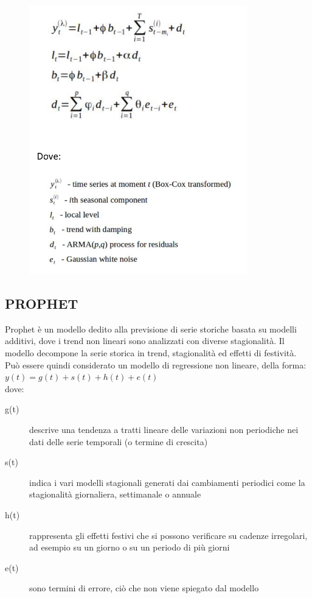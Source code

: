\documentclass[12pt, a4paper, twocolumn]{article} %
\begin{document}
\begin{figure}
  \caption{\protect\cite{tbats}}
  \begin{center}
    \includegraphics{tbats2.png}
  \end{center}
\end{figure}

\subsection{PROPHET}
Prophet è un modello dedito alla previsione di serie storiche basata su modelli additivi, dove i trend non lineari sono analizzati con diverse stagionalità. Il modello decompone la serie storica in trend, stagionalità ed effetti di festività.\\
Può essere quindi considerato un modello di regressione non lineare, della forma:\\
$y(t) = g(t) + s(t) + h(t) + e(t)$\\
dove:
\begin{description}
	\item[g(t)] descrive una tendenza a tratti lineare delle variazioni non periodiche nei dati delle serie temporali (o termine di crescita)
	\item[s(t)] indica i vari modelli stagionali generati dai cambiamenti periodici come la stagionalità giornaliera, settimanale o annuale
	\item[h(t)] rappresenta gli effetti festivi che si possono verificare su cadenze irregolari, ad esempio su un giorno o su un periodo di più giorni
	\item[e(t)] sono termini di errore, ciò che non viene spiegato dal modello
\end{description}
\cite{mathprophet}\cite{fbprophet}
\end{document}
